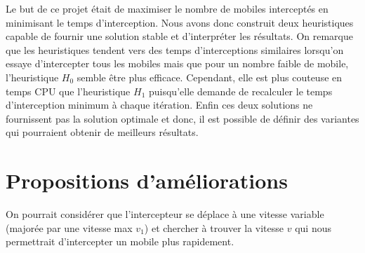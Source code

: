 Le but de ce projet était de maximiser le nombre de mobiles interceptés en minimisant le temps d'interception.
Nous avons donc construit deux heuristiques capable de fournir une solution stable et d'interpréter les résultats.
On remarque que les heuristiques tendent vers des temps d'interceptions similaires lorsqu'on essaye d'intercepter tous les mobiles mais que pour un nombre faible de mobile, l'heuristique $H_0$ semble être plus efficace.
Cependant, elle est plus couteuse en temps CPU que l'heuristique $H_1$ puisqu'elle demande de recalculer le temps d'interception minimum à chaque itération.
Enfin ces deux solutions ne fournissent pas la solution optimale et donc, il est possible de définir des variantes qui pourraient obtenir de meilleurs résultats.
\section*{Propositions d'améliorations}

On pourrait considérer que l'intercepteur se déplace à une vitesse variable (majorée par une vitesse max $v_1$) et chercher à trouver la vitesse $v$ qui nous permettrait d'intercepter un mobile plus rapidement.
